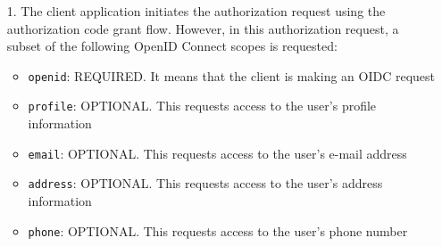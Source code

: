 \begin{itemize}
    \item[1.] The client application initiates the authorization request using the authorization code grant flow. However, in this authorization request, a subset of the following OpenID Connect scopes is requested:
    \item[] \begin{itemize}
        \item \texttt{openid}: REQUIRED. It means that the client is making an OIDC request
        \item \texttt{profile}: OPTIONAL. This requests access to the user's
    profile information
        \item \texttt{email}: OPTIONAL. This requests access to the user's e-mail address
        \item \texttt{address}: OPTIONAL. This requests access to the user's  address information
        \item \texttt{phone}: OPTIONAL. This requests access to the user's phone number
    \end{itemize}
    

\end{itemize}

